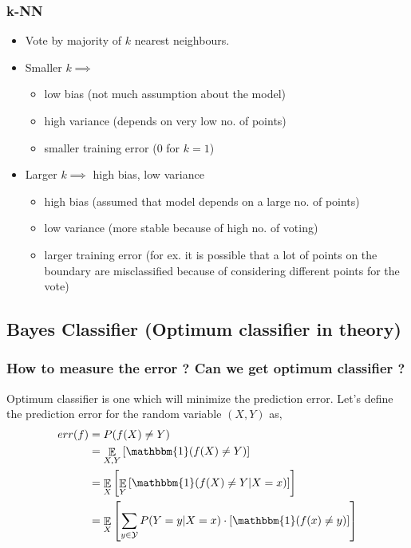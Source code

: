 \documentclass{article}
\DeclareMathOperator*{\E}{\mathop{\mathbb{E}}}
\newcommand{\mcaly}{\mathcal{Y}}
\begin{document}
\subsubsection{k-NN}
\begin{itemize}
    \item Vote by majority of $k$ nearest neighbours.
    \item Smaller $k \implies$ 
        \begin{itemize}
            \item low bias (not much assumption about the model)
            \item high variance (depends on very low no. of points)
            \item smaller training error (0 for $k=1$)
        \end{itemize}
    \item Larger $k \implies$ high bias, low variance
        \begin{itemize}
            \item high bias (assumed that model depends on a large no. of points)
            \item low variance (more stable because of high no. of voting)
            \item larger training error (for ex. it is possible that a lot of points on the boundary are misclassified because of considering different points for the vote)
        \end{itemize}
\end{itemize}


\subsection{Bayes Classifier (Optimum classifier in theory)}

\subsubsection{How to measure the error ? Can we get optimum classifier ?}
Optimum classifier is one which will minimize the prediction error. Let's define the prediction error for the random variable $(X,Y)$ as,
\begin{align*}
    err(f) &= P(f(X) \neq Y)\\
    &= \E_{X,Y}\left[\mathbbm{1} (f(X) \neq Y) \right]\\
    &= \E_{X}\left[ \E_{Y} \left[ \mathbbm{1} (f(X) \neq Y \vert X=x) \right] \right]\\
    &= \E_{X}\left[ \sum_{y \in \mcaly} P(Y=y \vert X=x) \cdot \left [\mathbbm{1} (f(x) \neq y) \right] \right]\\
\end{align*}
\end{document}
